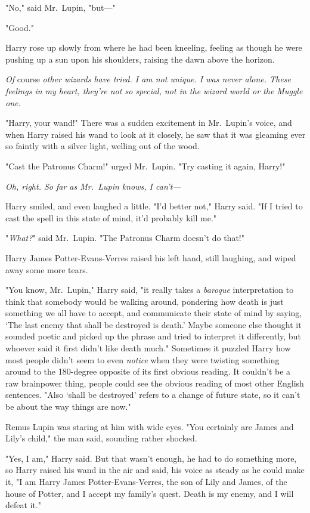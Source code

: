 "No," said Mr.~Lupin, "but\mbox{---}"

"Good."

Harry rose up slowly from where he had been kneeling, feeling as though he were
pushing up a sun upon his shoulders, raising the dawn above the horizon.

\emph{Of} course \emph{other wizards have tried. I am not unique. I was never
alone. These feelings in my heart, they're not so special, not in the wizard
world or the Muggle one.}

"Harry, your wand!" There was a sudden excitement in Mr.~Lupin's voice, and
when Harry raised his wand to look at it closely, he saw that it was gleaming
ever so faintly with a silver light, welling out of the wood.

"Cast the Patronus Charm!" urged Mr.~Lupin. "Try casting it again, Harry!"

\emph{Oh, right. So far as Mr.~Lupin knows, I can't---}

Harry smiled, and even laughed a little. "I'd better not," Harry said. "If I
tried to cast the spell in this state of mind, it'd probably kill me."

"\emph{What?}" said Mr.~Lupin. "The Patronus Charm doesn't do that!"

Harry James Potter-Evans-Verres raised his left hand, still laughing, and wiped
away some more tears.

"You know, Mr.~Lupin," Harry said, "it really takes a \emph{baroque}
interpretation to think that somebody would be walking around, pondering how
death is just something we all have to accept, and communicate their state of
mind by saying, `The last enemy that shall be destroyed is death.' Maybe
someone else thought it sounded poetic and picked up the phrase and tried to
interpret it differently, but whoever said it first didn't like death much."
Sometimes it puzzled Harry how most people didn't seem to even \emph{notice}
when they were twisting something around to the 180-degree opposite of its
first obvious reading. It couldn't be a raw brainpower thing, people could see
the obvious reading of most other English sentences. "Also `shall be destroyed'
refers to a change of future state, so it can't be about the way things are
now."

Remus Lupin was staring at him with wide eyes. "You certainly are James and
Lily's child," the man said, sounding rather shocked.

"Yes, I am," Harry said. But that wasn't enough, he had to do something more,
so Harry raised his wand in the air and said, his voice as steady as he could
make it, "I am Harry James Potter-Evans-Verres, the son of Lily and James, of
the house of Potter, and I accept my family's quest. Death is my enemy, and I
will defeat it."

